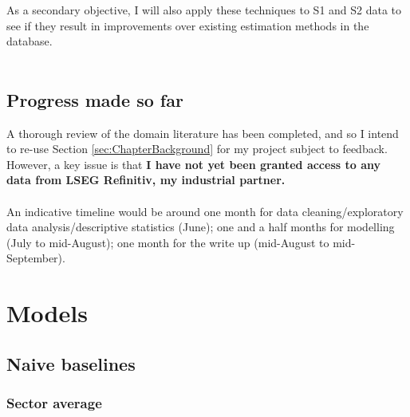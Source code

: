 \documentclass[12pt,twoside]{report}
\begin{document}
As a secondary objective, I will also apply these techniques to S1 and S2 data to see if they result in improvements over existing estimation methods in the database.  
\\\\
\section{Progress made so far}
A thorough review of the domain literature has been completed, and so I intend to re-use Section \ref{sec:ChapterBackground} for my project subject to feedback. However, a key issue is that \textbf{I have not yet been granted access to any data from LSEG Refinitiv, my industrial partner.} 
\\\\
An indicative timeline would be around one month for data cleaning/exploratory data analysis/descriptive statistics (June); one and a half months for modelling (July to mid-August); one month for the write up (mid-August to mid-September). 

\chapter{Models}
\section{Naive baselines}
\subsection{Sector average}





\end{document}
